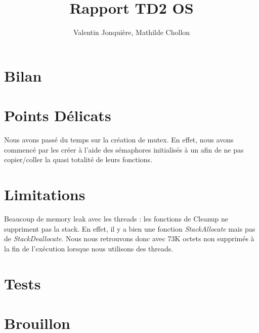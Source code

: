 \documentclass{article}
\author{
    Valentin Jonquière,
    Mathilde Chollon
}
\title{Rapport TD2 OS}
\begin{document}
\maketitle

\pagebreak

\tableofcontents

\pagebreak

\section{Bilan}

\section{Points Délicats}
Nous avons passé du temps sur la création de mutex. En effet, nous avons commencé par les créer à l'aide
des sémaphores initialisés à un afin de ne pas copier/coller la quasi totalité de leurs fonctions.

\section{Limitations}
Beaucoup de memory leak avec les threads : les fonctions de Cleanup ne suppriment pas la stack.
En effet, il y a bien une fonction \textit{StackAllocate} mais pas de \textit{StackDeallocate}.
Nous nous retrouvons donc avec 73K octets non supprimés à la fin de l'exécution lorsque nous utilisons des threads.

\section{Tests}

\section{Brouillon}
\end{document}
